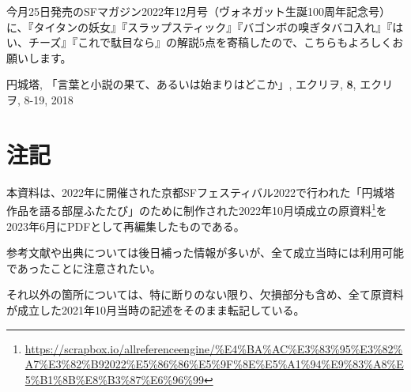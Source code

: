 \documentclass[10pt, a5paper, twoside]{jsarticle}
\theoremstyle{definition}
\begin{document}
		今月25日発売のSFマガジン2022年12月号（ヴォネガット生誕100周年記念号）に、『タイタンの妖女』『スラップスティック』『バゴンボの嗅ぎタバコ入れ』『はい、チーズ』『これで駄目なら』の解説5点を寄稿したので、こちらもよろしくお願いします。

	\begin{thebibliography}{99}

		 円城塔, 「言葉と小説の果て、あるいは始まりはどこか」, エクリヲ, \textbf{8}, エクリヲ, 8-19, 2018

	\end{thebibliography}

	\clearpage

	\section*{注記}

		本資料は、2022年に開催された京都SFフェスティバル2022で行われた「円城塔作品を語る部屋ふたたび」のために制作された2022年10月頃成立の原資料\footnote{\url{https://scrapbox.io/allreferenceengine/%E4%BA%AC%E3%83%95%E3%82%A7%E3%82%B92022%E5%86%86%E5%9F%8E%E5%A1%94%E9%83%A8%E5%B1%8B%E8%B3%87%E6%96%99}}を2023年6月にPDFとして再編集したものである。

		参考文献や出典については後日補った情報が多いが、全て成立当時には利用可能であったことに注意されたい。

		それ以外の箇所については、特に断りのない限り、欠損部分も含め、全て原資料が成立した2021年10月当時の記述をそのまま転記している。
\end{document}
